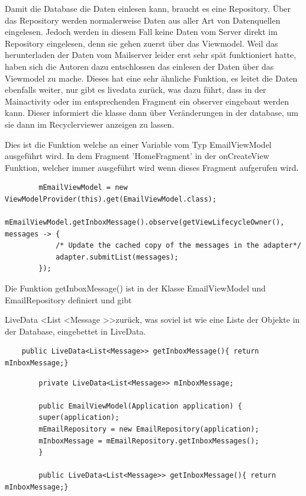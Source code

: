 \documentclass[a4paper,11pt]{article}
\begin{document}
Damit die Database die Daten einlesen kann, braucht es eine Repository. Über das Repository werden normalerweise Daten aus aller Art von Datenquellen eingelesen. Jedoch
werden in diesem Fall keine Daten vom Server direkt im Repository eingelesen, denn sie gehen zuerst über das Viewmodel.
Weil das herunterladen der Daten vom Mailserver leider erst sehr spät funktioniert hatte, 
haben sich die Autoren dazu entschlossen das einlesen der Daten über das Viewmodel zu mache. Dieses hat eine sehr ähnliche Funktion, 
es leitet die Daten ebenfalls weiter, nur gibt es \gls{livedata} zurück, was dazu führt, dass in der Mainactivity oder im entsprechenden Fragment ein \gls{observer} 
eingebaut werden kann. Dieser informiert die klasse dann über Veränderungen in der database, um sie dann im Recyclerviewer anzeigen zu lassen. 
\cite{appStructurePicture}

Dies ist die Funktion welche an einer Variable vom Typ EmailViewModel ausgeführt wird. In dem Fragment 'HomeFragment' in der
onCreateView Funktion, welcher immer ausgeführt wird wenn dieses Fragment aufgerufen wird. 


\lstset{language=java}
\begin{lstlisting}
        mEmailViewModel = new ViewModelProvider(this).get(EmailViewModel.class);
        mEmailViewModel.getInboxMessage().observe(getViewLifecycleOwner(), messages -> {
            /* Update the cached copy of the messages in the adapter*/
            adapter.submitList(messages);
        });
\end{lstlisting}

\begingroup
\nohyphenation

Die Funktion getInboxMessage() ist in der Klasse EmailViewModel und EmailRepository definiert und gibt 

LiveData \textless List \textless Message \textgreater \textgreater  zurück, was soviel ist wie eine Liste der Objekte in der Database, eingebettet 
in LiveData.

\endgroup

\lstset{language=java}
\begin{lstlisting}
    public LiveData<List<Message>> getInboxMessage(){ return mInboxMessage;}

\end{lstlisting}

\lstset{language=java}
\begin{lstlisting}
        private LiveData<List<Message>> mInboxMessage;

        public EmailViewModel(Application application) {
        super(application);
        mEmailRepository = new EmailRepository(application);
        mInboxMessage = mEmailRepository.getInboxMessages();
        }

        public LiveData<List<Message>> getInboxMessage(){ return mInboxMessage;}

\end{lstlisting}
\end{document}
